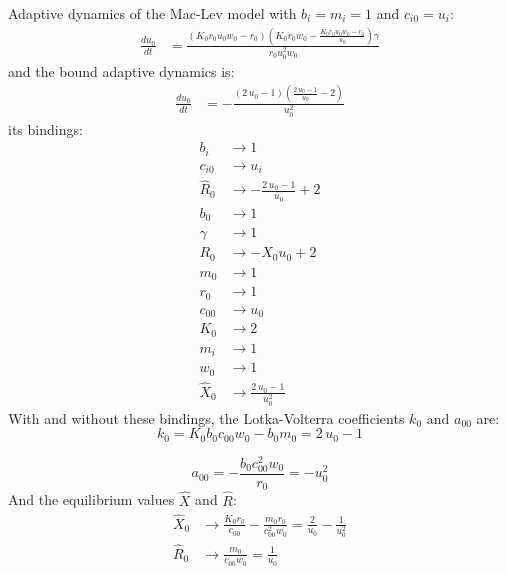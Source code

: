 \documentclass{article}
\begin{document}
Adaptive dynamics of the Mac-Lev model with $b_i=m_i=1$ and $c_{i0} = u_i$:
\[\begin{align*}
\frac{du_{0}}{dt} &= \frac{{\left(K_{0} r_{0} u_{0} w_{0} - r_{0}\right)} {\left(K_{0} r_{0} w_{0} - \frac{K_{0} r_{0} u_{0} w_{0} - r_{0}}{u_{0}}\right)} \gamma}{r_{0} u_{0}^{2} w_{0}}
\end{align*}\]
and the bound adaptive dynamics is:\begin{align*}
\frac{du_{0}}{dt} &= -\frac{{\left(2 \, u_{0} - 1\right)} {\left(\frac{2 \, u_{0} - 1}{u_{0}} - 2\right)}}{u_{0}^{2}}
\end{align*}its bindings:\begin{align*}
  b_{i} &\to 1 \\
  c_{i0} &\to u_{i} \\
  \hat{R}_{0} &\to -\frac{2 \, u_{0} - 1}{u_{0}} + 2 \\
  b_{0} &\to 1 \\
  \gamma &\to 1 \\
  R_{0} &\to -X_{0} u_{0} + 2 \\
  m_{0} &\to 1 \\
  r_{0} &\to 1 \\
  c_{00} &\to u_{0} \\
  K_{0} &\to 2 \\
  m_{i} &\to 1 \\
  w_{0} &\to 1 \\
  \hat{X}_{0} &\to \frac{2 \, u_{0} - 1}{u_{0}^{2}}
\end{align*}With and without these bindings, the Lotka-Volterra coefficients $k_0$ and $a_{00}$ are:
\[
  k_{0} = K_{0} b_{0} c_{00} w_{0} - b_{0} m_{0} = 2 \, u_{0} - 1
\]

\[
  a_{00} = -\frac{b_{0} c_{00}^{2} w_{0}}{r_{0}} = -u_{0}^{2}
\]
And the equilibrium values $\hat X$ and $\hat R$:\begin{align*}
  \hat X_0 &\to \frac{K_{0} r_{0}}{c_{00}} - \frac{m_{0} r_{0}}{c_{00}^{2} w_{0}} = \frac{2}{u_{0}} - \frac{1}{u_{0}^{2}}\\
  \hat R_0 &\to \frac{m_{0}}{c_{00} w_{0}} = \frac{1}{u_{0}}
\end{align*}
\end{document}
